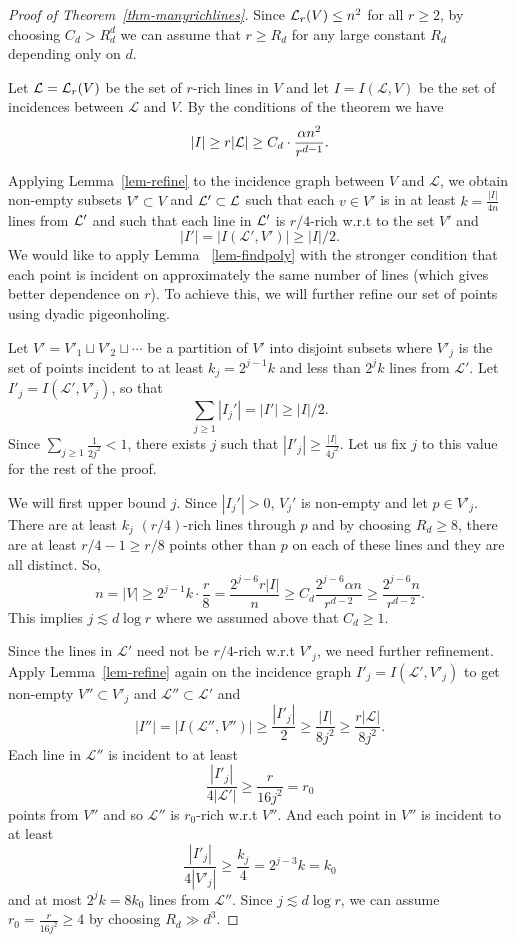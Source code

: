 \documentclass[11pt]{article}
\def\L{{\mathcal L}}
\def\cL{{\cal L}}
\begin{document}
\begin{proof}[Proof of Theorem~\ref{thm-manyrichlines}]
 Since $\cL_r(V)\le n^2$ for all $r\ge 2$, by choosing $C_d> R_d^d$ we can assume that $r\ge R_d$ for any large constant $R_d$ depending only on $d$.

Let $\cL = \cL_r(V)$ be the set of $r$-rich lines in $V$ and let $I=I(\L,V)$ 
be the set of incidences between $\L$ and $V$. By the conditions of the theorem we have
\begin{equation}\label{eq-largeI}
	|I| \ge r|\cL| \geq C_d\cdot\frac{\alpha n^2}{r^{d-1}}.
\end{equation}

Applying Lemma~\ref{lem-refine} to the incidence graph between $V$ and $\L$, we obtain non-empty subsets $V' \subset V$ and $\cL' \subset \cL$ such 
that each $v \in V'$ is in at least $k=\frac{|I|}{4n}$ lines from $\cL'$ and such that each line in 
$\cL'$ is $r/4$-rich w.r.t to the set $V'$ and $$|I'|=|I(\L',V')|\ge |I|/2.$$ We would like to  apply Lemma~
\ref{lem-findpoly} with the stronger condition that each point is incident on approximately the same number of lines (which gives better dependence on $r$). To achieve this, we will further refine our set of points using dyadic pigeonholing. 

Let $V'=V'_1\sqcup V'_2\sqcup \cdots$ be a partition of $V'$ into disjoint subsets where $V'_j$ is the set of points incident to at least $k_j=2^{j-1}k$ and less than $2^{j}k$ lines from $\L'$. Let $I'_j=I(\L',V'_j)$, so that $$\sum_{j\ge 1} |I_j'|=|I'|\ge |I|/2.$$ Since $\sum_{j\ge 1}\frac{1}{2j^2}<1$, there exists $j$ such that $|I'_j|\ge \frac{|I|}{4j^2}.$ Let us fix $j$ to this value for the rest of the proof.

We will first upper bound $j$. Since $|I_j'|>0$, $V_j'$ is non-empty and let $p\in V'_j$. There are at least $k_j$ $(r/4)$-rich lines through $p$ and by choosing $R_d\ge 8$, there are at least $r/4-1\ge r/8$ points other than $p$ on each of these lines and they are all distinct. So, 
$$n=|V|\ge 2^{j-1}k\cdot \frac{r}{8} = \frac{2^{j-6}r|I|}{n}\ge C_d \frac{2^{j-6}\alpha n}{r^{d-2}}\ge \frac{2^{j-6}n}{r^{d-2}}.$$ This implies
$j\lesssim  d\log r$ where we assumed above that $C_d\ge 1$.

Since the lines in $\L'$ need not be $r/4$-rich w.r.t $V'_j$, we need further refinement. Apply Lemma~\ref{lem-refine} again on the incidence graph $I'_j= I(\L',V'_j)$ to get non-empty $V''\subset V'_j$ and $\L''\subset \L'$ and $$|I''|=|I(\L'',V'')|\ge \frac{|I'_j|}{2}\ge \frac{|I|}{8j^2} \ge \frac{r|\L|}{8j^2}.$$ Each line in $\L''$ is incident to at least $$\frac{|I'_j|}{4|\L'|} \geq \frac{r}{16j^2}=r_0$$ points from $V''$ and so $\L''$ is $r_0$-rich w.r.t $V''$. And each point in $V''$ is incident to at least $$\frac{|I'_j|}{4|V'_j|}\ge \frac{k_j}{4}=2^{j-3} k=k_0$$  and at most $2^{j}k=8k_0$ lines from $\L''$. Since $j\lesssim d\log r$, we can assume $r_0=\frac{r}{16j^2}\ge 4$ by choosing $R_d \gg d^3$.


\end{proof}
\end{document}
